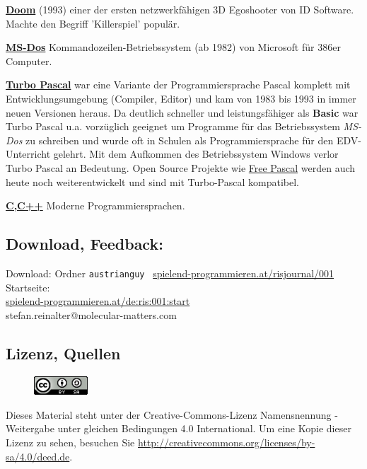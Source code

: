 \documentclass[10pt,a4paper,ngerman,twoside]{article} %
\begin{document}
\begin{multicols}{3}
\href{https://de.wikipedia.org/wiki/Doom}{\textbf{Doom}} (1993) einer der ersten netzwerkfähigen 3D Egoshooter von ID Software. Machte den Begriff 'Killerspiel' populär.

\href{https://de.wikipedia.org/wiki/MS_DOS}{\textbf{MS-Dos}} Kommandozeilen-Betriebssystem (ab 1982) von Microsoft für 386er Computer. 

\href{https://de.wikipedia.org/wiki/Turbo_Pascal}{\textbf{Turbo Pascal}} war eine Variante der Programmiersprache Pascal komplett mit Entwicklungsumgebung (Compiler, Editor) und kam von 1983 bis 1993 in immer neuen Versionen heraus. Da deutlich schneller und leistungsfähiger als \textbf{Basic} war Turbo Pascal u.a. vorzüglich geeignet um Programme für das Betriebssystem \textit{MS-Dos} zu schreiben und wurde oft in Schulen als Programmiersprache für den EDV-Unterricht gelehrt. Mit dem Aufkommen des Betriebssystem Windows verlor Turbo Pascal an Bedeutung. Open Source Projekte wie \href{https://de.wikipedia.org/wiki/Free_Pascal}{Free Pascal} werden auch heute noch weiterentwickelt und sind mit  Turbo-Pascal kompatibel.

\href{https://de.wikipedia.org/wiki/C_(Programmiersprache)}{\textbf{C,C++}} Moderne Programmiersprachen.

\subsection*{Download, Feedback:}
\footnotesize{
Download: Ordner \texttt{austrianguy} \Mundus\ \href{http://spielend-programmieren.at/risjournal/001}{spielend-programmieren.at/risjournal/001}\\
Startseite:\\
\href{http://spielend-programmieren.at/de:ris:001:start}{spielend-programmieren.at/de:ris:001:start}\\ 
\Letter\: stefan.reinalter@molecular-matters.com\\}
\normalsize 

\subsection*{Lizenz, Quellen}
\begin{figure}
\includegraphics[width=2cm]{austrianguy/ccbysa88x31.png}
\end{figure}
Dieses Material steht unter der Creative-Commons-Lizenz Namensnennung - Weitergabe unter gleichen Bedingungen 4.0 International. Um eine Kopie dieser Lizenz zu sehen, besuchen Sie \url{http://creativecommons.org/licenses/by-sa/4.0/deed.de}.


\end{multicols}
\end{document}
